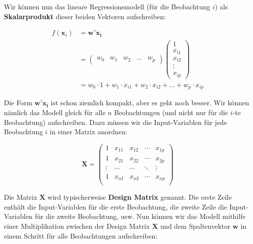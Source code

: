 \documentclass[
]{book}
\begin{document}
Wir können nun das lineare Regressionsmodell (für die Beobachtung \(i\)) als \textbf{Skalarprodukt} dieser beiden Vektoren aufschreiben:

\begin{align}
f(\mathbf{x}_i) &= \mathbf{w}' \mathbf{x_i}\\ 
&= \begin{pmatrix} w_0 & w_1 & w_2 & \dots & w_p \end{pmatrix} \begin{pmatrix} 1\\ x_{i1} \\ x_{i2} \\ \vdots \\ x_{ip} \end{pmatrix}\\
&= w_0 \cdot 1 + w_1 \cdot x_{i1} + w_2 \cdot x_{i2} + \dots + w_p \cdot x_{ip}
\end{align}

Die Form \(\mathbf{w}' \mathbf{x_i}\) ist schon ziemlich kompakt, aber es geht noch besser. Wir können nämlich das Modell gleich für alle \(n\) Beobachtungen (und nicht nur für die \(i\)-te Beobachtung) aufschreiben. Dazu müssen wir die Input-Variablen für jede Beobachtung \(i\) in einer Matrix anordnen:

\[
\mathbf{X} = \begin{pmatrix}
1 & x_{11} & x_{12} & \cdots & x_{1p}\\ 
1 & x_{21} & x_{22} & \cdots & x_{2p}\\
\vdots & \cdots & \cdots & \ddots & \vdots\\
1 & x_{n1} & x_{n2} & \cdots & x_{np}\\
\end{pmatrix}
\]

Die Matrix \(\mathbf{X}\) wird typischerweise \textbf{Design Matrix} genannt. Die erste Zeile enthält die Input-Variablen für die erste Beobachtung, die zweite Zeile die Input-Variablen für die zweite Beobachtung, usw. Nun können wir das Modell mithilfe einer Multiplikation zwischen der Design Matrix \(\mathbf{X}\) und dem Spaltenvektor \(\mathbf{w}\) in einem Schritt für alle Beobachtungen aufschreiben:
\end{document}

